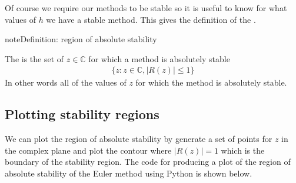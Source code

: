 \documentclass[letterpaper,10pt,english]{jupyterBook}
\begin{document}
\sphinxAtStartPar
Of course we require our methods to be stable so it is useful to know for what values of \(h\) we have a stable method. This gives the definition of the .

\begin{sphinxadmonition}{note}{Definition: region of absolute stability}

\sphinxAtStartPar
The  is the set of \(z\in \mathbb{C}\) for which a method is absolutely stable
\begin{align*}
    \{ z:z\in \mathbb{C},|R(z)|\leq 1 \} 
\end{align*}
\sphinxAtStartPar
In other words all of the values of \(z\) for which the method is absolutely stable.
\end{sphinxadmonition}


\subsection{Plotting stability regions}
\label{\detokenize{4_Stability/4.1_Stability_functions:plotting-stability-regions}}\label{\detokenize{4_Stability/4.1_Stability_functions:plot-stability-region-section}}
\sphinxAtStartPar
We can plot the region of absolute stability by generate a set of points for \(z\) in the complex plane and plot the contour where \(|R(z)| = 1\) which is the boundary of the stability region. The code for producing a plot of the region of absolute stability of the Euler method using Python is shown below.
\end{document}
